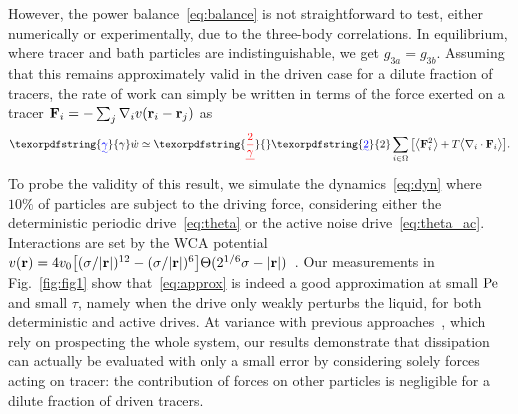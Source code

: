 \documentclass[superscriptaddress, twocolumn, prx, longbibliography, nofootinbib]{revtex4-1}
\providecommand{\DIFaddtex}[1]{{\protect\color{blue}\uwave{#1}}} %
\providecommand{\DIFdeltex}[1]{{\protect\color{red}\sout{#1}}}                      %
\providecommand{\DIFaddbegin}{} %
\providecommand{\DIFaddend}{} %
\providecommand{\DIFdelbegin}{} %
\providecommand{\DIFdelend}{} %
\providecommand{\DIFadd}[1]{\texorpdfstring{\DIFaddtex{#1}}{#1}} %
\providecommand{\DIFdel}[1]{\texorpdfstring{\DIFdeltex{#1}}{}} %
\begin{document}
However, the power balance~\eqref{eq:balance} is not straightforward to test, either numerically or experimentally, due to the three-body correlations. In equilibrium, where tracer and bath particles are indistinguishable, we get $g_{3a}=g_{3b}$. Assuming that this remains approximately valid in the driven case for a dilute fraction of tracers, the rate of work can simply be written in terms of the force exerted on a tracer ${\bf F}_i =- \sum_j\nabla_iv({\bf r}_i-{\bf r}_j)$ as
\begin{equation}\label{eq:approx}
	\DIFaddbegin \DIFadd{\gamma}\DIFaddend \dot w \simeq \DIFdelbegin \DIFdel{\frac{2}{\gamma}}\DIFdelend \DIFaddbegin \DIFadd{2}\DIFaddend \sum_{i\in\Omega} \big[ \big\langle{\bf F}_i^2\big\rangle + T \big\langle\nabla_i\cdot{\bf F}_i\big\rangle \big] .
\end{equation}
To probe the validity of this result, we simulate the dynamics~\eqref{eq:dyn} where $10\%$ of particles are subject to the driving force, considering either the deterministic periodic drive~\eqref{eq:theta} or the active noise drive~\eqref{eq:theta_ac}. Interactions are set by the WCA potential $v({\bf r})=4v_0\big[(\sigma/|{\bf r}|)^{12}-(\sigma/|{\bf r}|)^6\big]\Theta(2^{1/6}\sigma-|{\bf r}|)$~\cite{WCA1971}. Our measurements in Fig.~\ref{fig:fig1} show that~\eqref{eq:approx} is indeed a good approximation at small $\rm Pe$ and small $\tau$, namely when the drive only weakly perturbs the liquid, for both deterministic and active drives. At variance with previous approaches~\cite{Harada2005, Lander2012, Battle604}, which rely on prospecting the whole system, our results demonstrate that dissipation can actually be evaluated with only a small error by considering solely forces acting on tracer: the contribution of forces on other particles is negligible for a dilute fraction of driven tracers.
\end{document}
